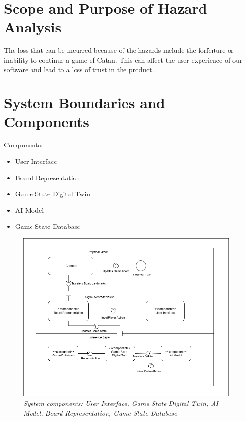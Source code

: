 \documentclass{article}
\begin{document}
\section{Scope and Purpose of Hazard Analysis}\label{sec:scope-and-purpose-of-hazard-analysis}



The loss that can be incurred because of the hazards include the
forfeiture or inability to continue a game of Catan. This can affect the
user experience of our software and lead to a loss of trust in the product.


\section{System Boundaries and Components}\label{sec:system-boundaries-and-components}




Components: 
\begin{itemize}

\item User Interface
\item Board Representation
\item Game State Digital Twin
\item AI Model
\item Game State Database

\end{itemize}

\begin{figure}[H]
    \centering
    \includegraphics[width=\textwidth]{Component_Diagram_hazards.png}
    \caption{\textit{System components: User Interface, Game State Digital Twin, AI Model, Board Representation, Game State Database}}
    \label{fig:component-diagram}
\end{figure}
\end{document}
